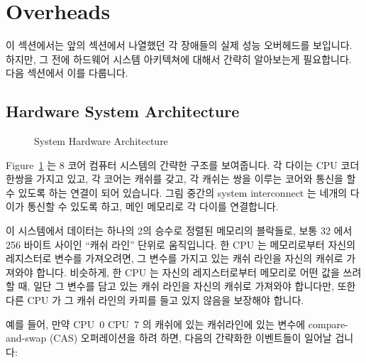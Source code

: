 
\section{Overheads}
\label{sec:cpu:Overheads}

이 섹션에서는 앞의 섹션에서 나열했던 각 장애들의 실제 성능 오버헤드를 보입니다.
하지만, 그 전에 하드웨어 시스템 아키텍쳐에 대해서 간략히 알아보는게 필요합니다.
다음 섹션에서 이를 다룹니다.

\subsection{Hardware System Architecture}
\label{sec:cpu:Hardware System Architecture}

\begin{figure}[tb]
\begin{center}
\end{center}
\caption{System Hardware Architecture}
\label{fig:cpu:System Hardware Architecture}
\end{figure}

Figure~\ref{fig:cpu:System Hardware Architecture} 는 8 코어 컴퓨터 시스템의
간략한 구조를 보여줍니다.
각 다이는 CPU 코더 한쌍을 가지고 있고, 각 코어는 캐쉬를 갖고, 각 캐쉬는 쌍을
이루는 코어와 통신을 할 수 있도록 하는 연결이 되어 있습니다.
그림 중간의 system interconnect 는 네개의 다이가 통신할 수 있도록 하고, 메인
메모리로 각 다이를 연결합니다.

이 시스템에서 데이터는 하나의 2의 승수로 정렬된 메모리의 블락들로, 보통 32 에서
256 바이트 사이인 ``캐쉬 라인'' 단위로 움직입니다.
한 CPU 는 메모리로부터 자신의 레지스터로 변수를 가져오려면, 그 변수를 가지고
있는 캐쉬 라인을 자신의 캐쉬로 가져와야 합니다.
비슷하게, 한 CPU 는 자신의 레지스터로부터 메모리로 어떤 값을 쓰려 할 때, 일단
그 변수를 담고 있는 캐쉬 라인을 자신의 캐쉬로 가져와야 합니다만, 또한 다른 CPU
가 그 캐쉬 라인의 카피를 들고 있지 않음을 보장해야 합니다.

예를 들어, 만약 CPU~0 CPU~7 의 캐쉬에 있는 캐쉬라인에 있는 변수에
compare-and-swap (CAS) 오퍼레이션을 하려 하면, 다음의 간략화한 이벤트들이
일어날 겁니다:

